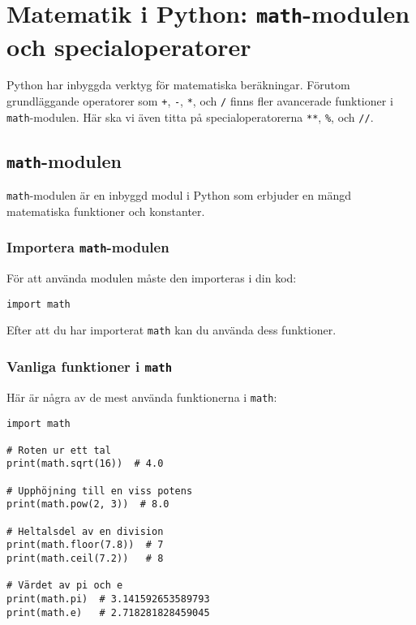 \section{Matematik i Python: \texttt{math}-modulen och specialoperatorer}
\label{section:math}
Python har inbyggda verktyg för matematiska beräkningar. Förutom grundläggande operatorer som \texttt{+}, \texttt{-}, \texttt{*}, och \texttt{/} finns fler avancerade funktioner i \texttt{math}-modulen. Här ska vi även titta på specialoperatorerna \texttt{**}, \texttt{\%}, och \texttt{//}.

\subsection{\texttt{math}-modulen}
\texttt{math}-modulen är en inbyggd modul i Python som erbjuder en mängd matematiska funktioner och konstanter.

\subsubsection{Importera \texttt{math}-modulen}
För att använda modulen måste den importeras i din kod:
\begin{lstlisting}[title=Exempel: Importera \texttt{math}]
import math
\end{lstlisting}

Efter att du har importerat \texttt{math} kan du använda dess funktioner.

\subsubsection{Vanliga funktioner i \texttt{math}}
Här är några av de mest använda funktionerna i \texttt{math}:
\begin{lstlisting}[title=Exempel på \texttt{math}-funktioner]
import math

# Roten ur ett tal
print(math.sqrt(16))  # 4.0

# Upphöjning till en viss potens
print(math.pow(2, 3))  # 8.0

# Heltalsdel av en division
print(math.floor(7.8))  # 7
print(math.ceil(7.2))   # 8

# Värdet av pi och e
print(math.pi)  # 3.141592653589793
print(math.e)   # 2.718281828459045
\end{lstlisting}


